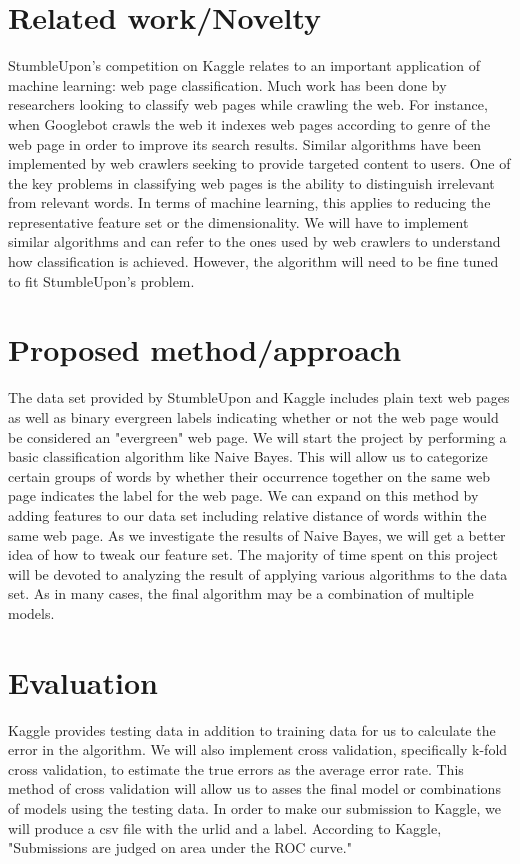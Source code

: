 \documentclass[11pt]{amsart}
\begin{document}
\section{Related work/Novelty}
StumbleUpon's competition on Kaggle relates to an important application of machine learning: web page classification. Much work has been done by researchers looking to classify web pages while crawling the web. For instance, when Googlebot crawls the web it indexes web pages according to genre of the web page in order to improve its search results. Similar algorithms have been implemented by web crawlers seeking to provide targeted content to users. One of the key problems in classifying web pages is the ability to distinguish irrelevant from relevant words. In terms of machine learning, this applies to reducing the representative feature set or the dimensionality. We will have to implement similar algorithms and can refer to the ones used by web crawlers to understand how classification is achieved. However, the algorithm will need to be fine tuned to fit StumbleUpon's problem.

\section{Proposed method/approach}
The data set provided by StumbleUpon and Kaggle includes plain text web pages as well as binary evergreen labels indicating whether or not the web page would be considered an "evergreen" web page. We will start the project by performing a basic classification algorithm like Naive Bayes. This will allow us to categorize certain groups of words by whether their occurrence together on the same web page indicates the label for the web page. We can expand on this method by adding features to our data set including relative distance of words within the same web page. As we investigate the results of Naive Bayes, we will get a better idea of how to tweak our feature set. The majority of time spent on this project will be devoted to analyzing the result of applying various algorithms to the data set. As in many cases, the final algorithm may be a combination of multiple models.

\section{Evaluation}
Kaggle provides testing data in addition to training data for us to calculate the error in the algorithm. We will also implement cross validation, specifically k-fold cross validation, to estimate the true errors as the average error rate. This method of cross validation will allow us to asses the final model or combinations of models using the testing data. In order to make our submission to Kaggle, we will produce a csv file with the urlid and a label. According to Kaggle, "Submissions are judged on area under the ROC curve."
\end{document}
